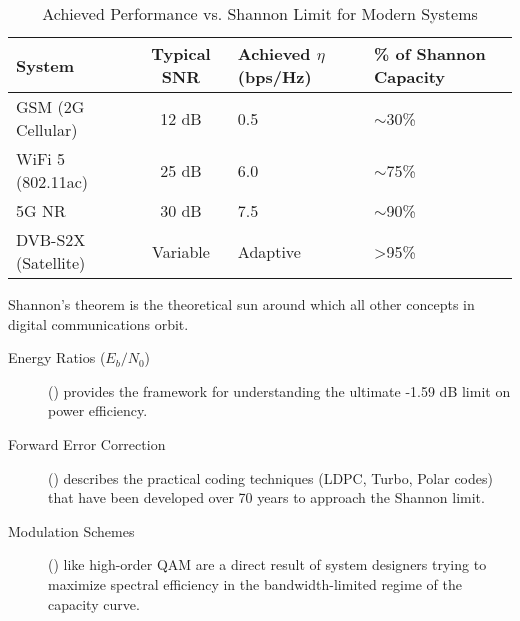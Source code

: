 \begin{table}[H]
    \centering
    \caption{Achieved Performance vs. Shannon Limit for Modern Systems}
    \label{tab:shannon-gap}
    \begin{tabularx}{\textwidth}{@{}XcXX@{}}
        \toprule
        \tableheaderfont System & \tableheaderfont Typical SNR & \tableheaderfont Achieved $\eta$ (bps/Hz) & \tableheaderfont \% of Shannon Capacity \\
        \midrule
        GSM (2G Cellular) & 12 dB & 0.5 & $\sim$30\% \\
        WiFi 5 (802.11ac) & 25 dB & 6.0 & $\sim$75\% \\
        5G NR & 30 dB & 7.5 & $\sim$90\% \\
        DVB-S2X (Satellite) & Variable & Adaptive & >95\% \\
        \bottomrule
    \end{tabularx}
\end{table}


\begin{importantbox}[title={Further Reading}]
    Shannon's theorem is the theoretical sun around which all other concepts in digital communications orbit.
    \begin{description}
        \item[Energy Ratios ($E_b/N_0$)] () provides the framework for understanding the ultimate -1.59 dB limit on power efficiency.
        \item[Forward Error Correction] () describes the practical coding techniques (LDPC, Turbo, Polar codes) that have been developed over 70 years to approach the Shannon limit.
        \item[Modulation Schemes] () like high-order QAM are a direct result of system designers trying to maximize spectral efficiency in the bandwidth-limited regime of the capacity curve.
    \end{description}
\end{importantbox}

